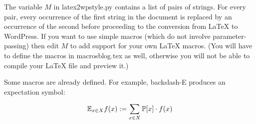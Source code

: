 \documentclass[12pt]{article}
\begin{document}
The variable $M$ in latex2wpstyle.py contains a list of pairs of strings.
For every pair, every occurrence of the first string in the document is
replaced by an occurrence of the second before proceeding to the
conversion from LaTeX to WordPress. If you want to use simple macros
(which do not involve parameter-passing) then edit $M$ to add support
for your own LaTeX macros. (You will have to define the macros in
macrosblog.tex as well, otherwise you will not be able to compile
your LaTeX file and preview it.)

Some macros are already defined. For example, backslash-E produces
an expectation symbol:

\[ {\mathbb E}_{x \in X} f(x) := \sum_{x\in X} {\mathbb P} [x] \cdot f(x) \]
\end{document}
